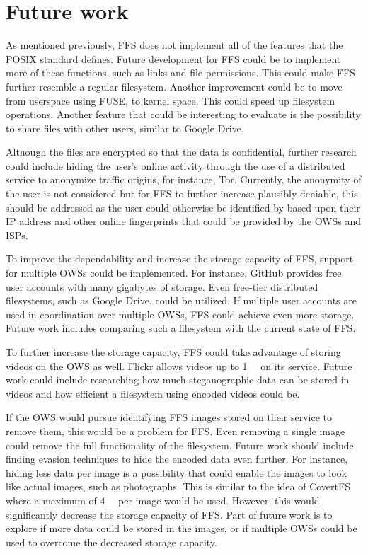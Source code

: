 
\section{Future work}
\label{sec:futureWork}
As mentioned previously, \gls{FFS} does not implement all of the features that the POSIX standard defines. Future development for \gls{FFS} could be to implement more of these functions, such as links and file permissions. This could make \gls{FFS} further resemble a regular filesystem. Another improvement could be to move from userspace using \gls{FUSE}, to kernel space. This could speed up filesystem operations. Another feature that could be interesting to evaluate is the possibility to share files with other users, similar to Google Drive.

Although the files are encrypted so that the data is confidential, further research could include hiding the user's online activity through the use of a distributed service to anonymize traffic origins, for instance, Tor. Currently, the anonymity of the user is not considered but for \gls{FFS} to further increase plausibly deniable, this should be addressed as the user could otherwise be identified by based upon their IP address and other online fingerprints that could be provided by the \glspl{OWS} and \glspl{ISP}.

To improve the dependability and increase the storage capacity of \gls{FFS}, support for multiple \glspl{OWS} could be implemented. For instance, GitHub provides free user accounts with many gigabytes of storage. Even \mbox{free-tier} distributed filesystems, such as Google Drive, could be utilized. If multiple user accounts are used in coordination over multiple \glspl{OWS}, \gls{FFS} could achieve even more storage. Future work includes comparing such a filesystem with the current state of \gls{FFS}.

To further increase the storage capacity, \gls{FFS} could take advantage of storing videos on the \gls{OWS} as well. Flickr allows videos up to \SI[per-mode = symbol]{1}{\giga\byte} on its service. Future work could include researching how much steganographic data can be stored in videos and how efficient a filesystem using encoded videos could be.

If the \gls{OWS} would pursue identifying \gls{FFS} images stored on their service to remove them, this would be a problem for \gls{FFS}. Even removing a single image could remove the full functionality of the filesystem. Future work should include finding evasion techniques to hide the encoded data even further. For instance, hiding less data per image is a possibility that could enable the images to look like actual images, such as photographs. This is similar to the idea of CovertFS\,\cite{baliga2007web} where a maximum of \SI[per-mode = symbol]{4}{\kilo\byte} per image would be used. However, this would significantly decrease the storage capacity of \gls{FFS}. Part of future work is to explore if more data could be stored in the images, or if multiple \glspl{OWS} could be used to overcome the decreased storage capacity. 

